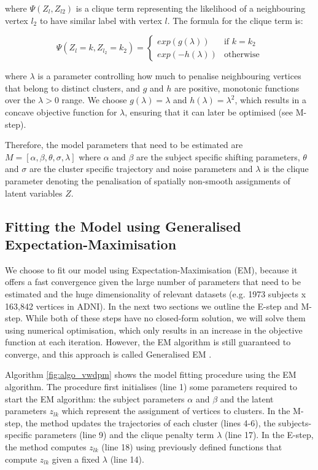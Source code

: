 where $\Psi(Z_l, Z_{l2})$ is a clique term representing the likelihood of a neighbouring vertex $l_2$ to have similar label with vertex $l$. The formula for the clique term is:

\begin{equation}
 \Psi (Z_{l}=k, Z_{l_2}=k_2) = 
 \begin{cases}
  exp(g(\lambda)) & \text{if } k = k_2\\
  exp(-h(\lambda)) & \text{otherwise}
 \end{cases}
\end{equation} 

where $\lambda$ is a parameter controlling how much to penalise neighbouring vertices that belong to distinct clusters, and $g$ and $h$ are positive, monotonic functions over the $\lambda>0$ range. We choose $g(\lambda)=\lambda$ and $h(\lambda)=\lambda^2$, which results in a concave objective function for $\lambda$, ensuring that it can later be optimised (see M-step).

Therefore, the model parameters that need to be estimated are $M = [\alpha, \beta, \theta, \sigma, \lambda]$ where $\alpha$ and $\beta$ are the subject specific shifting parameters, $\theta$ and $\sigma$ are the cluster specific trajectory and noise parameters and $\lambda$ is the clique parameter denoting the penalisation of spatially non-smooth assignments of latent variables $Z$. 

\subsection{Fitting the Model using Generalised Expectation-Maximisation}
\label{sec:diveFit}

We choose to fit our model using Expectation-Maximisation (EM), because it offers a fast convergence given the large number of parameters that need to be estimated and the huge dimensionality of relevant datasets (e.g. 1973 subjects x 163,842 vertices in ADNI). In the next two sections we outline the E-step and M-step. While both of these steps have no closed-form solution, we will solve them using numerical optimisation, which only results in an increase in the objective function at each iteration. However, the EM algorithm is still guaranteed to converge, and this approach is called Generalised EM \cite{bishop2007pattern}.

Algorithm \ref{fig:algo_vwdpm} shows the model fitting procedure using the EM algorithm. The procedure first initialises (line 1) some parameters required to start the EM algorithm: the subject parameters $\alpha$ and $\beta$ and the latent parameters $z_{lk}$ which represent the assignment of vertices to clusters. In the M-step, the method updates the trajectories of each cluster (lines 4-6), the subjects-specific parameters (line 9) and the clique penalty term $\lambda$ (line 17). In the E-step, the method computes $z_{lk}$ (line 18) using previously defined functions that compute $z_{lk}$ given a fixed $\lambda$ (line 14).


